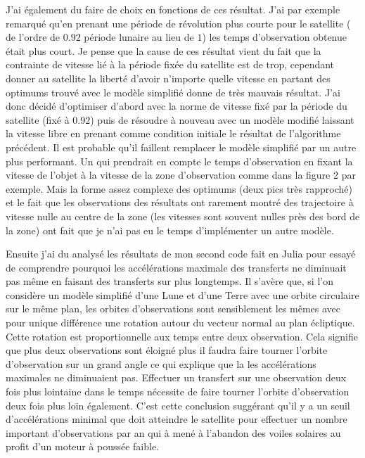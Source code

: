 \documentclass[12pt]{article} %
\begin{document}
		J'ai également du faire de choix en fonctions de ces résultat. J'ai par exemple remarqué qu'en prenant une période de révolution plus courte pour le satellite ( de l'ordre de $0.92$ période lunaire au lieu de $1$) les temps d'observation obtenue était plus court. Je pense que la cause de ces résultat vient du fait que la contrainte de vitesse lié à la période fixée du satellite est de trop, cependant donner au satellite la liberté d'avoir n'importe quelle vitesse en partant des optimums trouvé avec le modèle simplifié donne de très mauvais résultat. J'ai donc décidé d'optimiser d'abord avec la norme de vitesse fixé par la période du satellite (fixé à $0.92$) puis de résoudre à nouveau avec un modèle modifié laissant la vitesse libre en prenant comme condition initiale le résultat de l'algorithme précédent. Il est probable qu'il faillent remplacer le modèle simplifié par un autre plus performant. Un qui prendrait en compte le temps d'observation en fixant la vitesse de l'objet à la vitesse de la zone d'observation comme dans la figure 2 par exemple. Mais la forme assez complexe des optimums (deux pics très rapproché) et le fait que les observations des résultats ont rarement montré des trajectoire à vitesse nulle au centre de la zone (les vitesses sont souvent nulles près des bord de la zone) ont fait que je n'ai pas eu le temps d'implémenter un autre modèle.
		
		Ensuite j'ai du analysé les résultats de mon second code fait en Julia pour essayé de comprendre pourquoi les accélérations maximale des transferts ne diminuait pas même en faisant des transferts sur plus longtemps.
		Il s'avère que, si l'on considère un modèle simplifié d'une Lune et d'une Terre avec une orbite circulaire sur le même plan, les orbites d'observations sont sensiblement les mêmes avec pour unique différence une rotation autour du vecteur normal au plan écliptique. Cette rotation est proportionnelle aux temps entre deux observation. Cela signifie que plus deux observations sont éloigné plus il faudra faire tourner l'orbite d'observation sur un grand angle ce qui explique que la les accélérations maximales ne diminuaient pas. Effectuer un transfert sur une observation deux fois plus lointaine dans le temps nécessite de faire tourner l'orbite d'observation deux fois plus loin également. C'est cette conclusion suggérant qu'il y a un seuil d'accélérations minimal que doit atteindre le satellite pour effectuer un nombre important d'observations par an qui à mené à l'abandon des voiles solaires au profit d'un moteur à poussée faible.
		
\end{document}
